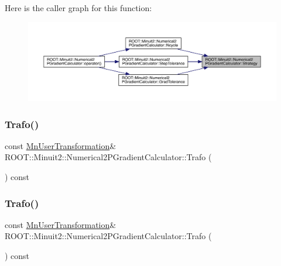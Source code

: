 Here is the caller graph for this function\+:\nopagebreak
\begin{figure}[H]
\begin{center}
\leavevmode
\includegraphics[width=350pt]{d0/d82/classROOT_1_1Minuit2_1_1Numerical2PGradientCalculator_a71eb0622c53ddf5d3d319fa676cbbd6e_icgraph}
\end{center}
\end{figure}
\mbox{\label{classROOT_1_1Minuit2_1_1Numerical2PGradientCalculator_a5a0bce9f2c00da4aae9a2b6d3b706010}} 
\subsubsection{\texorpdfstring{Trafo()}{Trafo()}\hspace{0.1cm}{\footnotesize\ttfamily [1/2]}}
{\footnotesize\ttfamily const \mbox{\hyperlink{classROOT_1_1Minuit2_1_1MnUserTransformation}{Mn\+User\+Transformation}}\& R\+O\+O\+T\+::\+Minuit2\+::\+Numerical2\+P\+Gradient\+Calculator\+::\+Trafo (\begin{DoxyParamCaption}{ }\end{DoxyParamCaption}) const\hspace{0.3cm}{\ttfamily [inline]}}

\mbox{\label{classROOT_1_1Minuit2_1_1Numerical2PGradientCalculator_a5a0bce9f2c00da4aae9a2b6d3b706010}} 
\subsubsection{\texorpdfstring{Trafo()}{Trafo()}\hspace{0.1cm}{\footnotesize\ttfamily [2/2]}}
{\footnotesize\ttfamily const \mbox{\hyperlink{classROOT_1_1Minuit2_1_1MnUserTransformation}{Mn\+User\+Transformation}}\& R\+O\+O\+T\+::\+Minuit2\+::\+Numerical2\+P\+Gradient\+Calculator\+::\+Trafo (\begin{DoxyParamCaption}{ }\end{DoxyParamCaption}) const\hspace{0.3cm}{\ttfamily [inline]}}

